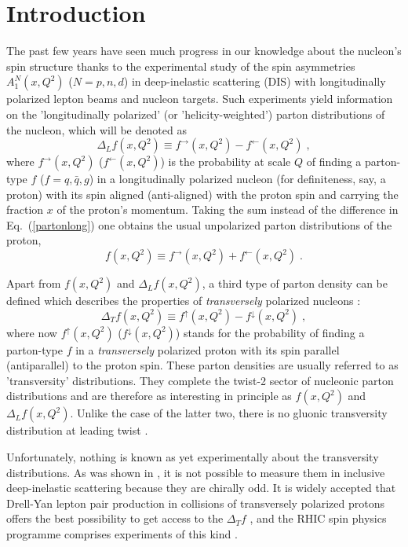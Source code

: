 \section{Introduction}
%
The past few years have seen much progress in our knowledge about the
nucleon's spin structure thanks to the experimental study of the spin 
asymmetries $A_1^N (x,Q^2)$ ($N=p,n,d$) in deep-inelastic scattering (DIS) 
with longitudinally polarized lepton beams and nucleon targets. 
Such experiments yield information on the 'longitudinally polarized'
(or 'helicity-weighted') parton distributions of the nucleon, 
which will be denoted as
\begin{equation} \label{partonlong}
\Delta_L f(x,Q^2) \equiv f^{\rightarrow} (x,Q^2) - f^{\leftarrow} (x,Q^2) \; ,
\end{equation}
where $f^{\rightarrow} (x,Q^2)$ ($f^{\leftarrow} (x,Q^2)$) is the 
probability at scale $Q$ of finding a
parton-type $f$ ($f=q,\bar{q},g$) in a longitudinally polarized nucleon 
(for definiteness, say, a proton) with its spin aligned (anti-aligned) with 
the proton spin and carrying the fraction $x$ of the proton's momentum.
Taking the sum instead of the difference in Eq.~(\ref{partonlong}) one
obtains the usual unpolarized parton distributions of the proton,
\begin{equation} \label{partonunp}
f(x,Q^2) \equiv f^{\rightarrow} (x,Q^2) + f^{\leftarrow} (x,Q^2) \; .
\end{equation}

Apart from $f(x,Q^2)$ and $\Delta_L f(x,Q^2)$, a third type of parton 
density can be defined which describes the properties of {\em transversely} 
polarized nucleons \cite{rs,am,jaffe,cortes}:
\begin{equation} \label{partontrans}
\Delta_T f(x,Q^2) \equiv f^{\uparrow} (x,Q^2) - f^{\downarrow} (x,Q^2) \; ,
\end{equation}
where now $f^{\uparrow} (x,Q^2)$ ($f^{\downarrow} (x,Q^2)$) stands for
the probability of finding a parton-type $f$ in a {\em transversely} 
polarized proton with its spin parallel (antiparallel) to the proton spin.
These parton densities are usually referred to as 'transversity' 
distributions. They complete the twist-2 sector of nucleonic parton
distributions and are therefore as interesting in principle as $f(x,Q^2)$ and 
$\Delta_L f(x,Q^2)$. Unlike the case of the latter two, there is no 
gluonic transversity distribution at leading twist \cite{ji,soffer1}. 

Unfortunately, nothing is known as yet experimentally about the transversity
distributions. As was shown in \cite{am,jaffe,cortes}, it is not 
possible to measure them in inclusive deep-inelastic scattering because 
they are chirally odd. It is widely accepted that Drell-Yan lepton pair 
production in collisions of transversely polarized protons offers the best 
possibility to get access to the $\Delta_T f$ 
\cite{rs,am,jaffe,cortes,sivers,alex,cont1,dyrefs}, and the RHIC spin physics 
programme comprises experiments of this kind \cite{rhic}.    

